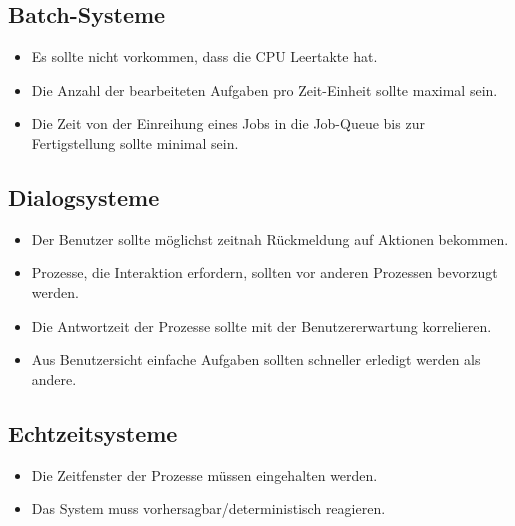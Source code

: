 \subsection{Batch-Systeme}
\begin{itemize}
  \item {}Es sollte nicht vorkommen, dass die CPU Leertakte hat.
  \item Die Anzahl der bearbeiteten Aufgaben pro Zeit-Einheit sollte maximal sein.
  \item Die Zeit von der Einreihung eines Jobs in die Job-Queue bis zur Fertigstellung sollte minimal sein.
\end{itemize}

\subsection{Dialogsysteme}
\begin{itemize}
  \item {}Der Benutzer sollte möglichst zeitnah Rückmeldung auf Aktionen bekommen.
  \item Prozesse, die Interaktion erfordern, sollten vor anderen Prozessen bevorzugt werden.
  \item Die Antwortzeit der Prozesse sollte mit der Benutzererwartung korrelieren.
  \item Aus Benutzersicht einfache Aufgaben sollten schneller erledigt werden als andere.
\end{itemize}

\subsection{Echtzeitsysteme}
\begin{itemize}
  \item {}Die Zeitfenster der Prozesse müssen eingehalten werden.
  \item Das System muss vorhersagbar\slash{}deterministisch reagieren.
\end{itemize}

